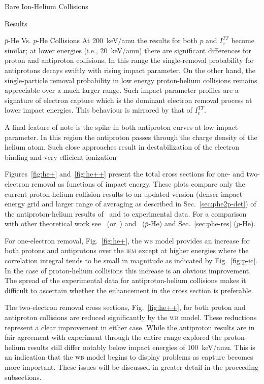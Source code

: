 \documentclass[letterpaper, 11 pt]{report}
\begin{document}
\begin{chapter}{Bare Ion-Helium Collisions \label{chap:p-he2p-he}}
\begin{section}{Results \label{sec:phe2p-res}}
\begin{subsection}{ \texorpdfstring{$\bar{p}$}{pbar}-He Vs. \texorpdfstring{$p$}{p}-He Collisions
                         \label{sec:pbarhe-res}}
         At 200~keV/amu the results for both $p$ and $I^{TT}_\mathrm{c}$ become similar; at lower
         energies (i.e., 20~keV/amu) there are significant differences for proton and antiproton
         collisions. In this range the single-removal probability for antiprotons decays swiftly with
         rising impact parameter. On the other hand, the single-particle removal probability in low
         energy proton-helium collisions remains appreciable over a much larger range. Such impact
         parameter profiles are a signature of electron capture which is the dominant electron removal
         process at lower impact energies. This behaviour is mirrored by that of $I^{TT}_\mathrm{c}$.

         A final feature of note is the spike in both antiproton curves at low impact parameter. In this
         region the antiproton passes through the charge density of the helium atom. Such close
         approaches result in destabilization of the electron binding and very efficient
         ionization~\cite{pbarhe-rev}

         Figures~\ref{fig:he+} and~\ref{fig:he++} present the total cross sections for one- and
         two-electron removal as functions of impact energy. These plots compare only the current
         proton-helium collision results to an updated version (denser impact energy grid and larger
         range of averaging as described in Sec.~\ref{sec:phe2p-det}) of the antiproton-helium results
         of~\cite{pbarhe} and to experimental data. For a comparison with other theoretical work
         see~\cite{thesis} (or~\cite{pbarhe}) and~\cite{new-pbarhe} ($\bar{p}$-He) and
         Sec.~\ref{sec:phe-res} ($p$-He).

         For one-electron removal, Fig.~\ref{fig:he+}, the \textsc{wb} model provides an increase for
         both protons and antiprotons over the \textsc{iem} except at higher energies where the
         correlation integral tends to be small in magnitude as indicated by Fig.~\ref{fig:p-ic}. In the
         case of proton-helium collisions this increase is an obvious improvement. The spread of the
         experimental data for antiproton-helium collisions makes it difficult to ascertain whether the
         enhancement in the cross section is preferable.

         The two-electron removal cross sections, Fig.~\ref{fig:he++}, for both proton and antiproton
         collisions are reduced significantly by the \textsc{wb} model. These reductions represent a
         clear improvement in either case. While the antiproton results are in fair agreement with
         experiment through the entire range explored the proton-helium results still differ notably
         below impact energies of 100~keV/amu. This is an indication that the \textsc{wb} model begins
         to display problems as capture becomes more important. These issues will be discussed in
         greater detail in the proceeding subsections.


\end{subsection}
\end{section}
\end{chapter}
\end{document}
